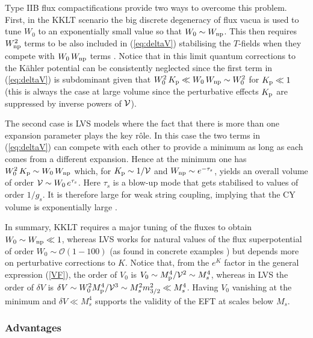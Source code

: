 \documentclass[11pt,a4paper]{article}
\newcommand{\vo}{\mathcal{V}}
\def\vo{{{\cal{V}}}}
\newcommand{\mc}{\mathcal}
\begin{document}
Type IIB flux compactifications provide two ways to overcome this problem. First, in the KKLT scenario the big discrete degeneracy of flux vacua is used to tune $W_0$ to an exponentially small value so that $W_0\sim W_{\rm np}$. This then requires $W_{\rm np}^2$ terms to be also included in (\ref{eq:deltaV}) stabilising the $T$-fields when they compete with $W_0\, W_{\rm np}$ terms \cite{Kachru:2003aw}. Notice that in this limit quantum corrections to the K\"ahler potential can be consistently neglected since the first term in (\ref{eq:deltaV}) is subdominant given that $W_0^2 \,K_{\rm p} \ll W_0\, W_{\rm np} \sim W_0^2$ for $K_{\rm p}\ll 1$ (this is always the case at large volume since the perturbative effects $K_{\rm p}$ are suppressed by inverse powers of $\vo$).

The second case is LVS models where the fact that there is more than one expansion parameter plays the key r\^ole. In this case the two terms in (\ref{eq:deltaV}) can compete with each other to provide a minimum as long as each comes from a different expansion. Hence at the minimum one has $W_0^2\,K_{\rm p}\sim W_0 \,W_{\rm np}$ which, for $K_{\rm p}\sim 1/\vo$ and $W_{\rm np}\sim e^{-{\tau_s}}$, yields an overall volume of order $\vo\sim W_0\, e^{\tau_s}$. Here $\tau_s$ is a blow-up mode that gets stabilised to values of order $1/g_s$. It is therefore large for weak string coupling, implying that the CY volume is exponentially large \cite{Balasubramanian:2005zx, Conlon:2005ki, Cicoli:2008va}. 

In summary, KKLT requires a major tuning of the fluxes to obtain $W_0\sim W_{\rm np}\ll 1$, whereas LVS works for natural values of the flux superpotential of order $W_0\sim \mc{O}(1-100)$ (as found in concrete examples \cite{Louis:2012nb, Cicoli:2013cha}) but depends more on perturbative corrections to $K$. Notice that, from the $e^K$ factor in the general expression (\ref{VF}), the order of $V_0$ is $V_0\sim M_{\rm p}^4/\vo^2 \sim M_s^4$, whereas in LVS the order of $\delta V$ is $\delta V\sim W_0^2 M_{\rm p}^4 /\vo^3 \sim M_s^2 m_{3/2}^2\ll M_s^4$. Having $V_0$ vanishing at the minimum and $\delta V\ll M_s^4$ supports the  validity of the EFT at scales below $M_s$.


\subsubsection{Advantages}
\end{document}
